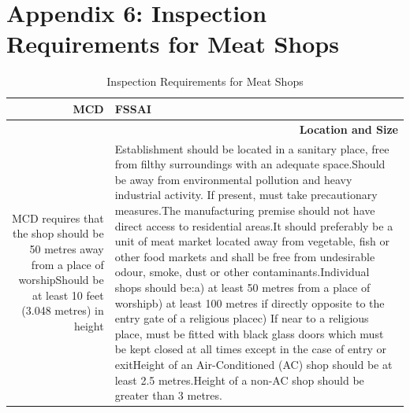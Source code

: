 \documentclass[a4paper, 12pt]{article}
\begin{document}
\section*{Appendix 6: Inspection Requirements for Meat Shops}
\begin{longtable}{rp{21.57em}}
\caption{Inspection Requirements for Meat Shops} \\
\midrule
\endfirsthead
\endhead
    \multicolumn{1}{p{11.93em}}{\textbf{MCD}} & FSSAI \\
    \midrule
    \multicolumn{2}{p{33.5em}}{\textbf{Location and Size}} \\
    \midrule
    \multicolumn{1}{p{11.93em}}{MCD requires that the shop should be 50 metres away from a place of worship\newline{}\newline{}Should be at least 10 feet (3.048 metres) in height} & Establishment should be located in a sanitary place, free from filthy surroundings with an adequate space.\newline{}\newline{}Should be away from environmental pollution and heavy industrial activity. If present, must take precautionary measures.\newline{}\newline{}The manufacturing premise should not have direct access to residential areas.\newline{}It should preferably be a unit of meat market located away from vegetable, fish or other food markets and shall be free from undesirable odour, smoke, dust or other contaminants.\newline{}\newline{}Individual shops should be:\newline{}a) at least 50 metres from a place of worship\newline{}b) at least 100 metres if directly opposite to the entry gate of a religious place\newline{}c) If near to a religious place, must be fitted with black glass doors which must be kept closed at all times except in the case of entry or exit\newline{}\newline{}Height of an Air-Conditioned (AC) shop should be at least 2.5 metres.\newline{}Height of a non-AC shop should be greater than 3 metres. \newline{}\newline{}\\

\end{longtable}
\end{document}
